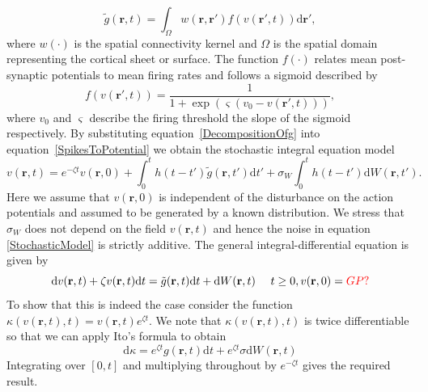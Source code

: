 \documentclass[]{article}
\newcommand{\red}{\textcolor{red}}
\begin{document}
\begin{equation}
	\label{RateBasedInteractions} \tilde{g}\left( \mathbf{r},t \right) = \int_\Omega {w\left( \mathbf{r},\mathbf{r}' \right)f\left( v\left( \mathbf{r}',t \right) \right)\textrm{d}\mathbf{r}'}, 
\end{equation}
where $w(\cdot)$ is the spatial connectivity kernel and $\Omega$ is the spatial domain representing the cortical sheet or surface. The function $f(\cdot)$ relates mean post-synaptic potentials to mean firing rates and follows a sigmoid described by
\begin{equation}
	\label{ActivationFunction} f\left( v\left( \mathbf{r}', t \right) \right) = \frac{1}{1 + \exp \left( \varsigma \left( v_0 - v\left(\mathbf{r}',t\right) \right) \right)}, 
\end{equation}
where $v_0$ and $\varsigma$ describe the firing threshold the slope of the sigmoid respectively. 
By substituting equation~\ref{DecompositionOfg} into equation~\ref{SpikesToPotential} we obtain the stochastic integral equation model 
\begin{equation}
	\label{StochasticModel} v\left(\mathbf{r},t\right) = e^{-\zeta t}v\left( {\mathbf{r},0} \right) +
	\int_{0}^t h\left(t - t'\right)\tilde{g}\left(\mathbf{r},t'\right) \textrm{d}t'+ \sigma_W\int_{0}^t h\left(t - t'\right)\textrm{d}W\left(\mathbf{r},t'\right).
\end{equation}
 Here we assume that $v\left( {\mathbf{r}},0 \right)$ is independent of the disturbance on the action potentials and assumed to be generated by a known distribution. We stress that $\sigma_W$ does not depend on the field $v({\mathbf{r}},t)$ and hence the noise in equation \ref{StochasticModel} is strictly additive. The general integral-differential equation is given by 
\begin{equation} \label{DifferentialEquationContTime}
 \textrm{d}v(\mathbf{r},t) + \zeta v(\mathbf{r},t)\textrm{d}t = \tilde{g}(\mathbf{r},t)\textrm{d}t + \textrm{d}W(\mathbf{r},t)  ~~~~ t \ge 0, v(\mathbf{r},0) = \red{GP?}
\end{equation}
To show that this is indeed the case consider the function $\kappa(v(\mathbf{r},t),t) = v(\mathbf{r},t)e^{\zeta t}$. We note that $\kappa(v(\mathbf{r},t),t)$ is twice differentiable so that we can apply Ito's formula to obtain
\begin{equation}
 \textrm{d}\kappa = e^{\zeta t}g(\mathbf{r},t)\textrm{d}t + e^{\zeta t}\sigma \textrm{d}W(\mathbf{r},t)
\end{equation}
\noindent Integrating over $[0,t]$ and multiplying throughout by $e^{-\zeta t}$ gives the required result.
\end{document}

